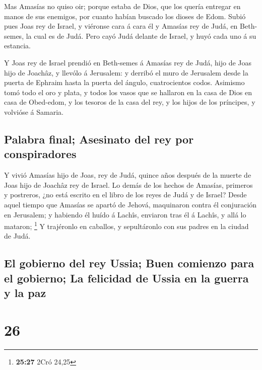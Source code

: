  Mas Amasías no quiso oir; porque estaba de Dios, que los
quería entregar en manos de sus enemigos, por cuanto habían buscado los
dioses de Edom.  Subió pues Joas rey de Israel, y viéronse
cara á cara él y Amasías rey de Judá, en Beth-semes, la cual es de Judá.
 Pero cayó Judá delante de Israel, y huyó cada uno á su
estancia.

 Y Joas rey de Israel prendió en Beth-semes á Amasías rey
de Judá, hijo de Joas hijo de Joachâz, y llevólo á Jerusalem: y derribó
el muro de Jerusalem desde la puerta de Ephraim hasta la puerta del
ángulo, cuatrocientos codos.  Asimismo tomó todo el oro y
plata, y todos los vasos que se hallaron en la casa de Dios en casa de
Obed-edom, y los tesoros de la casa del rey, y los hijos de los
príncipes, y volvióse á Samaria.

\hypertarget{palabra-final-asesinato-del-rey-por-conspiradores}{%
\subsection{Palabra final; Asesinato del rey por
conspiradores}\label{palabra-final-asesinato-del-rey-por-conspiradores}}

 Y vivió Amasías hijo de Joas, rey de Judá, quince años
después de la muerte de Joas hijo de Joachâz rey de Israel.
 Lo demás de los hechos de Amasías, primeros y postreros,
¿no está escrito en el libro de los reyes de Judá y de Israel?
 Desde aquel tiempo que Amasías se apartó de Jehová,
maquinaron contra él conjuración en Jerusalem; y habiendo él huído á
Lachîs, enviaron tras él á Lachîs, y allá lo mataron; \footnote{\textbf{25:27}
  2Cró 24,25}  Y trajéronlo en caballos, y sepultáronlo con
sus padres en la ciudad de Judá.

\hypertarget{el-gobierno-del-rey-ussia-buen-comienzo-para-el-gobierno-la-felicidad-de-ussia-en-la-guerra-y-la-paz}{%
\subsection{El gobierno del rey Ussia; Buen comienzo para el gobierno;
La felicidad de Ussia en la guerra y la
paz}\label{el-gobierno-del-rey-ussia-buen-comienzo-para-el-gobierno-la-felicidad-de-ussia-en-la-guerra-y-la-paz}}

\hypertarget{section-25}{%
\section{26}\label{section-25}}

